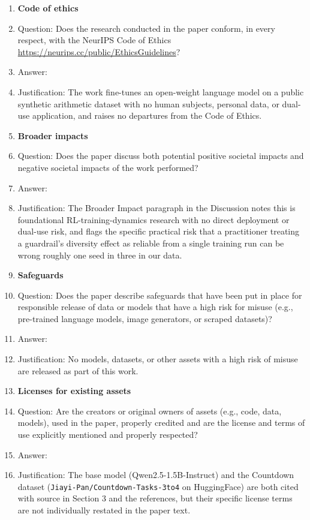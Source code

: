 \begin{enumerate}
\item {\bf Code of ethics}
    \item[] Question: Does the research conducted in the paper conform, in every respect, with the NeurIPS Code of Ethics \url{https://neurips.cc/public/EthicsGuidelines}?
    \item[] Answer: \answerYes{}
    \item[] Justification: The work fine-tunes an open-weight language model on a public synthetic arithmetic dataset with no human subjects, personal data, or dual-use application, and raises no departures from the Code of Ethics.

\item {\bf Broader impacts}
    \item[] Question: Does the paper discuss both potential positive societal impacts and negative societal impacts of the work performed?
    \item[] Answer: \answerYes{}
    \item[] Justification: The Broader Impact paragraph in the Discussion notes this is foundational RL-training-dynamics research with no direct deployment or dual-use risk, and flags the specific practical risk that a practitioner treating a guardrail's diversity effect as reliable from a single training run can be wrong roughly one seed in three in our data.

\item {\bf Safeguards}
    \item[] Question: Does the paper describe safeguards that have been put in place for responsible release of data or models that have a high risk for misuse (e.g., pre-trained language models, image generators, or scraped datasets)?
    \item[] Answer: \answerNA{}
    \item[] Justification: No models, datasets, or other assets with a high risk of misuse are released as part of this work.

\item {\bf Licenses for existing assets}
    \item[] Question: Are the creators or original owners of assets (e.g., code, data, models), used in the paper, properly credited and are the license and terms of use explicitly mentioned and properly respected?
    \item[] Answer: \answerNo{}
    \item[] Justification: The base model (Qwen2.5-1.5B-Instruct) and the Countdown dataset (\texttt{Jiayi-Pan/Countdown-Tasks-3to4} on HuggingFace) are both cited with source in Section 3 and the references, but their specific license terms are not individually restated in the paper text.


\end{enumerate}
